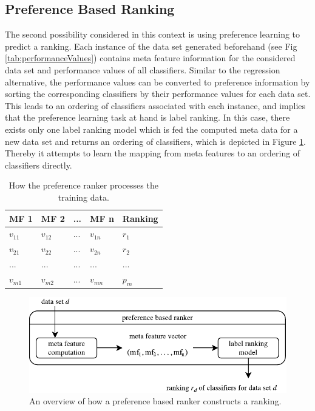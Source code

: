 \subsection{Preference Based Ranking}
The second possibility considered in this context is using preference learning to predict a ranking. Each instance of the data set generated beforehand (see Fig \ref{tab:performanceValues}) contains meta feature information for the considered data set and performance values of all classifiers. Similar to the regression alternative, the performance values can be converted to preference information by sorting the corresponding classifiers by their performance values for each data set. This leads to an ordering of classifiers associated with each instance, and implies that the preference learning task at hand is label ranking. In this case, there exists only one label ranking model which is fed the computed meta data for a new data set and returns an ordering of classifiers, which is depicted in Figure \ref{fig:preference_ranker_model}. Thereby it attempts to learn the mapping from meta features to an ordering of classifiers directly.

\begin{table}[h]
\centering
	\begin{tabularx}{\textwidth}{X | X | X | X | X}
		MF 1				& MF 2				& ... 	& MF n				& Ranking 	\\ \hline
		$v_{11}$			& $v_{12}$			& ...	& $v_{1n}$			& $r_1$		\\ 
		$v_{21}$			& $v_{22}$			& ...	& $v_{2n}$			& $r_2$		\\
		...				& ...				& ...	& ...				& ...		\\
		$v_{m1}$			& $v_{m2}$			& ... 	& $v_{mn}$			& $p_m$		 
	\end{tabularx}
	\label{tab:preferenceTable}
	\caption{How the preference ranker processes the training data.}
\end{table}

\begin{figure}
\centering
\includegraphics[scale=1]{gfx/label_ranking_model.pdf}
\caption{An overview of how a preference based ranker constructs a ranking.}
\label{fig:preference_ranker_model}
\end{figure}

